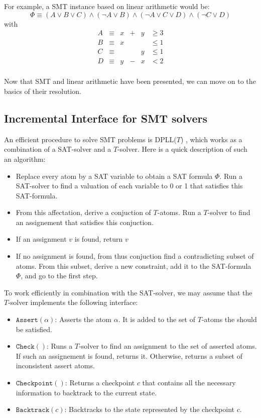 \documentclass{article}
\newcommand{\iassert}[1]{\mathtt{Assert}(#1)}
\newcommand{\icheck}{\mathtt{Check}()}
\newcommand{\icheckpoint}{\mathtt{Checkpoint}()}
\newcommand{\ibacktrack}[1]{\mathtt{Backtrack}(#1)}
\begin{document}
For example, a SMT instance based on linear arithmetic would be:
$$\Phi \equiv (A \vee B \vee C) \wedge (\neg A \vee B) \wedge
              (\neg A \vee C \vee D) \wedge (\neg C \vee D)$$
with
\begin{displaymath}
\begin{array}{lclccc}
  A & \equiv & x & + & y & \geqslant 3 \\
  B & \equiv & x &   &   & \leqslant 1 \\
  C & \equiv &   &   & y & \leqslant 1 \\
  D & \equiv & y & - & x & < 2         \\
\end{array}
\end{displaymath}

Now that SMT and linear arithmetic have been presented, we can move on to the
basics of their resolution.

\subsection{Incremental Interface for SMT solvers}
An efficient procedure to solve SMT problems is DPLL($T$)
\cite[Section 3.2]{Decision2016},
which works as a combination of a SAT-solver and a $T$-solver. Here is a quick
description of such an algorithm:
\begin{itemize}
  \item Replace every atom by a SAT variable to obtain a SAT formula $\Phi$.
    Run a SAT-solver to find a valuation of each variable to 0 or 1 that
    satisfies this SAT-formula.
  \item From this affectation, derive a conjuction of $T$-atoms. Run a
    $T$-solver to find an assignement that satisfies this conjuction.
  \item If an assignment $v$ is found, return $v$
  \item If no assignment is found, from thus conjuction find a contradicting
    subset of atoms. From this subset, derive a new constraint, add it to the
    SAT-formula $\Phi$, and go to the first step.
\end{itemize}

To work efficiently in combination with the SAT-solver, we may assume that the
$T$-solver implements the following interface:
\begin{itemize}
  \item $\iassert{\alpha}$: Asserts the atom $\alpha$. It is added to the set of
    $T$-atoms the should be satisfied.
  \item $\icheck$: Runs a $T$-solver to find an assignment to the set of
    asserted atoms. If such an assignement is found, returns it. Otherwise,
    returns a subset of inconsistent assert atoms.
  \item $\icheckpoint$: Returns a checkpoint $c$ that contains all the necessary
    information to backtrack to the current state.
  \item $\ibacktrack{c}$: Backtracks to the state represented by the checkpoint
    $c$.
\end{itemize}
\end{document}
